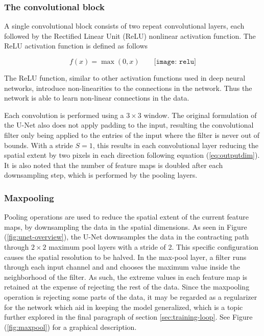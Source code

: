 \documentclass[../main/thesis.tex]{subfiles}
\begin{document}
\subsubsection{The convolutional block}
A single convolutional block consists of two repeat convolutional layers, each followed by the Rectified Linear Unit (ReLU) \citep{Nair2010} nonlinear activation function. The ReLU activation function is defined as follows

\begin{equation}
    f(x) = \max{(0,x)} \qquad
    \texttt{[image: relu]}
\end{equation}

The ReLU function, similar to other activation functions used in deep neural networks, introduce non-linearities to the connections in the network. Thus the network is able to learn non-linear connections in the data.

Each convolution is performed using a $3 \times 3$ window. The original formulation of the U-Net also does not apply padding to the input, resulting the convolutional filter only being applied to the entries of the input where the filter is never out of bounds. With a stride $S=1$, this results in each convolutional layer reducing the spatial extent by two pixels in each direction following equation (\ref{eq:outputdim}). It is also noted that the number of feature maps is doubled after each downsampling step, which is performed by the pooling layers.


\subsubsection{Maxpooling}
\label{sec:maxpool}
Pooling operations are used to reduce the spatial extent of the current feature maps, by downsampling the data in the spatial dimensions. As seen in Figure (\ref{fig:unet-overview}), the U-Net downsamples the data in the contracting path through $2 \times 2$ maximum pool layers with a stride of 2. This specific configuration causes the spatial resolution to be halved. In the max-pool layer, a filter runs through each input channel and and chooses the maximum value inside the neighborhood of the filter. As such, the extreme values in each feature map is retained at the expense of rejecting the rest of the data. Since the maxpooling operation is rejecting some parts of the data, it may be regarded as a regularizer for the network which aid in keeping the model generalized, which is a topic further explored in the final paragraph of section \ref{sec:training-loop}. See Figure (\ref{fig:maxpool}) for a graphical description.
\end{document}
